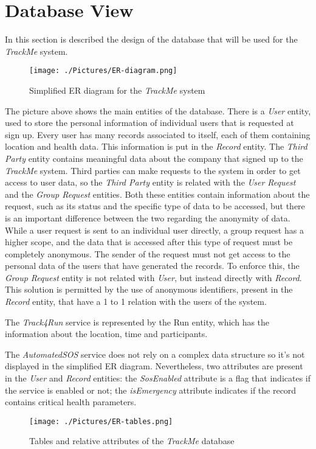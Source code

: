 \section{Database View}

In this section is described the design of the database that will be used for the \textit{TrackMe} system. 

\begin{figure}[H]
\texttt{[image: ./Pictures/ER-diagram.png]}
\centering
\caption{Simplified ER diagram for the \textit{TrackMe} system}
\end{figure}

The picture above shows the main entities of the database. There is a \textit{User} entity, used to store the personal information of individual users that is requested at sign up. Every user has many records associated to itself, each of them containing location and health data. This information is put in the \textit{Record} entity. The \textit{Third Party} entity contains meaningful data about the company that signed up to the \textit{TrackMe} system. Third parties can make requests to the system in order to get access to user data, so the \textit{Third Party} entity is related with the \textit{User Request} and the \textit{Group Request} entities. Both these entities contain information about the request, such as its status and the specific type of data to be accessed, but there is an important difference between the two regarding the anonymity of data. While a user request is sent to an individual user directly, a group request has a higher scope, and the data that 
is accessed after this type of request must be completely anonymous. The sender of the request must not get access to the personal data of the users that have generated the records. To enforce this, the \textit{Group Request} entity is not related with \textit{User}, but instead directly with \textit{Record}. This solution is permitted by the use of anonymous identifiers, present in the \textit{Record} entity, that have a 1 to 1 relation with the users of the system.

The \textit{Track4Run} service is represented by the Run entity, which has the information about the location, time and participants.

The \textit{AutomatedSOS} service does not rely on a complex data structure so it’s not displayed in the simplified ER diagram. Nevertheless, two attributes are present in the \textit{User} and \textit{Record} entities: the \textit{SosEnabled} attribute is a flag that indicates if the service is enabled or not; the \textit{isEmergency} attribute indicates if the record contains critical health parameters.

\begin{figure}[H]
\texttt{[image: ./Pictures/ER-tables.png]}
\centering
\caption{Tables and relative attributes of the \textit{TrackMe} database}
\end{figure}